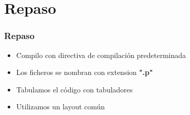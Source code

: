 \section{Repaso}

\begin{frame}
\frametitle{Repaso}

\begin{itemize}
	\item Compilo con directiva de compilación predeterminada
	\item Los ficheros se nombran con extension \textbf{".p"}
	\item Tabulamos el código con tabuladores
	\item Utilizamos un layout común
\end{itemize}

\end{frame}
